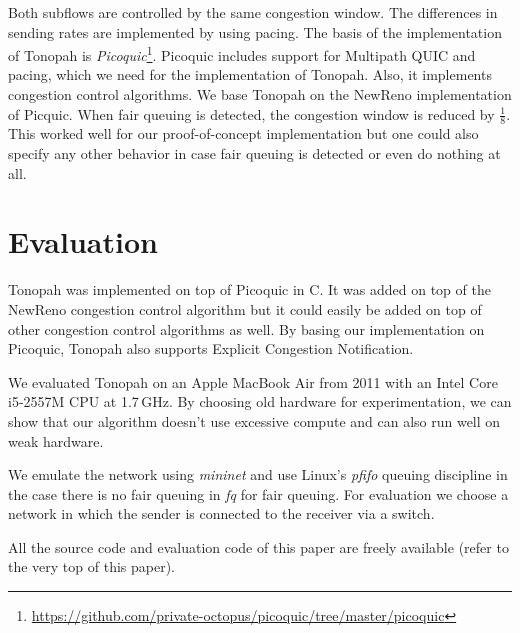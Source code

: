 \documentclass[conference]{IEEEtran}
\begin{document}
Both subflows are controlled by the same congestion window. The differences in sending rates are implemented by using pacing. 
The basis of the implementation of Tonopah is \textit{Picoquic}\footnote{\url{https://github.com/private-octopus/picoquic/tree/master/picoquic}}. 
Picoquic includes support for Multipath QUIC and pacing, which we need for the implementation of Tonopah. Also, it implements congestion control algorithms. 
We base Tonopah on the NewReno implementation of Picquic. When fair queuing is detected, the congestion window is reduced by $\frac{1}{8}$. 
This worked well for our proof-of-concept implementation but one could also specify any other behavior in case fair queuing is detected or even do nothing at all. 

\section{Evaluation}

Tonopah was implemented on top of Picoquic in C. It was added on top of the NewReno congestion control algorithm but it could easily be added on top of other 
congestion control algorithms as well. By basing our implementation on Picoquic, Tonopah also supports Explicit Congestion Notification. 

We evaluated Tonopah on an Apple MacBook Air from 2011 with an Intel Core i5-2557M CPU at 1.7\,GHz. 
By choosing old hardware for experimentation, we can show that our algorithm doesn't use excessive compute and can also run well on weak hardware. 

We emulate the network using \textit{mininet} and use Linux's \textit{pfifo} queuing discipline in the case there is no fair queuing in \textit{fq} for fair queuing. 
For evaluation we choose a network in which the sender is connected to the receiver via a switch. 

All the source code and evaluation code of this paper are freely available (refer to the very top of this paper). 
\end{document}
